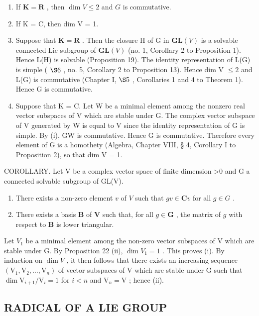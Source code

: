 \begin{enumerate}
\def\labelenumi{(\roman{enumi})}
\item
  If \(\mathbf{K} = \mathbf{R}\) , then \(\dim V \leqslant 2\) and \(G\) is commutative.
\item
  If K = C, then dim V = 1.
\item
  Suppose that \(\mathbf{K} = \mathbf{R}\) . Then the closure H of G in \(\mathbf{GL}(V)\) is a solvable connected Lie subgroup of \(\mathbf{GL}(V)\) (no. 1, Corollary 2 to Proposition 1). Hence L(H) is solvable (Proposition 19). The identity representation of L(G) is simple ( \(\S 6\) , no. 5, Corollary 2 to Proposition 13). Hence dim V \(\leqslant 2\) and L(G) is commutative (Chapter I, \(\S 5\) , Corollaries 1 and 4 to Theorem 1). Hence G is commutative.
\item
  Suppose that K = C. Let W be a minimal element among the nonzero real vector subspaces of V which are stable under G. The complex vector subspace of V generated by W is equal to V since the identity representation of G is simple. By (i), G\textbar W is commutative. Hence G is commutative. Therefore every element of G is a homothety (Algebra, Chapter VIII, § 4, Corollary I to Proposition 2), so that dim V = 1.
\end{enumerate}

COROLLARY. Let V be a complex vector space of finite dimension \textgreater0 and G a connected solvable subgroup of GL(V).

\begin{enumerate}
\def\labelenumi{(\roman{enumi})}
\item
  There exists a non-zero element \(v\) of \(V\) such that \(gv \in \mathbf{C}v\) for all \(g \in G\) .
\item
  There exists a basis \(\mathbf{B}\) of \(\mathbf{V}\) such that, for all \(g \in \mathbf{G}\) , the matrix of \(g\) with respect to \(\mathbf{B}\) is lower triangular.
\end{enumerate}

Let \(V_{1}\) be a minimal element among the non-zero vector subspaces of V which are stable under G. By Proposition 22 (ii), \(\dim V_{1} = 1\) . This proves (i). By induction on \(\dim V\) , it then follows that there exists an increasing sequence \((\mathrm{V}_1, \mathrm{V}_2, \ldots, \mathrm{V}_n)\) of vector subspaces of V which are stable under G such that \(\dim \mathrm{V}_{i+1} / \mathrm{V}_i = 1\) for \(i < n\) and \(\mathrm{V}_n = \mathrm{V}\) ; hence (ii).

\subsection{RADICAL OF A LIE GROUP}

